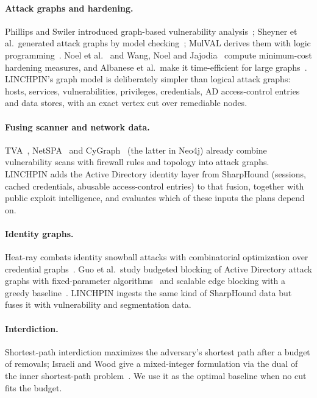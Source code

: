 \documentclass[11pt]{article}
\begin{document}
\paragraph{Attack graphs and hardening.} Phillips and Swiler introduced graph-based vulnerability
analysis~\cite{phillips1998graph}; Sheyner et al.\ generated attack graphs by model checking~\cite{sheyner2002automated};
MulVAL derives them with logic programming~\cite{ou2005mulval}. Noel et al.~\cite{noel2003efficient} and Wang, Noel and
Jajodia~\cite{wang2006minimum} compute minimum-cost hardening measures, and Albanese et al.\ make it time-efficient for
large graphs~\cite{albanese2012time}. LINCHPIN's graph model is deliberately simpler than logical attack graphs: hosts,
services, vulnerabilities, privileges, credentials, AD access-control entries and data stores, with an exact vertex cut
over remediable nodes.

\paragraph{Fusing scanner and network data.} TVA~\cite{jajodia2005topological}, NetSPA~\cite{ingols2006practical} and
CyGraph~\cite{noel2016cygraph} (the latter in Neo4j) already combine vulnerability scans with firewall rules and
topology into attack graphs. LINCHPIN adds the Active Directory identity layer from SharpHound (sessions, cached
credentials, abusable access-control entries) to that fusion, together with public exploit intelligence, and evaluates
which of these inputs the plans depend on.

\paragraph{Identity graphs.} Heat-ray combats identity snowball attacks with combinatorial optimization over
credential graphs~\cite{dunagan2009heatray}. Guo et al.\ study budgeted blocking of Active Directory attack graphs with
fixed-parameter algorithms~\cite{guo2022practical} and scalable edge blocking with a greedy
baseline~\cite{guo2023scalable}. LINCHPIN ingests the same kind of SharpHound data but fuses it with vulnerability and
segmentation data.

\paragraph{Interdiction.} Shortest-path interdiction maximizes the adversary's shortest path after a budget of
removals; Israeli and Wood give a mixed-integer formulation via the dual of the inner shortest-path
problem~\cite{israeli2002shortest}. We use it as the optimal baseline when no cut fits the budget.
\end{document}
